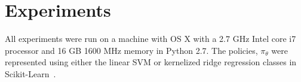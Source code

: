 \documentclass[10pt, conference]{ieeeconf}      %
\newcommand{\bx}{\mathbf{x}}
\begin{document}

 
 



\section{Experiments}
All experiments were run on a machine with OS X with a 2.7 GHz Intel core i7 processor and 16 GB
1600 MHz memory in Python 2.7. The policies, $\pi_\theta$ were represented using either the linear SVM or  kernelized ridge regression classes in Scikit-Learn~\cite{scikit-learn}.
\end{document}
